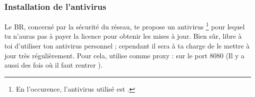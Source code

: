 







\subsubsection{Installation de l'antivirus}
\label{antivirus} Le BR, concerné par la sécurité du réseau, te propose un antivirus \footnote{En
l'occurence, l'antivirus utilisé est .} pour lequel tu n'auras pas à
payer la licence pour obtenir les mises à jour. Bien s\^{u}r, libre à toi d'utiliser ton antivirus
personnel ; cependant il sera à ta charge de le mettre à jour très régulièrement. Pour cela,
utilise comme proxy :  sur le port 8080 (Il y a aussi des fois o\`u il 
faut rentrer ).

